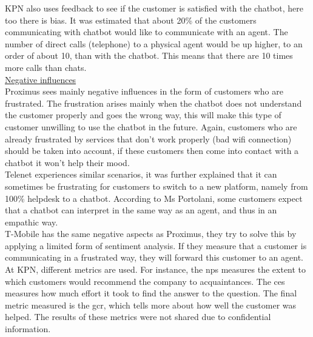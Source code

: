 \break
KPN also uses feedback to see if the customer is satisfied with the chatbot, here too there is bias. It was estimated that about 20\% of the customers communicating with chatbot would like to communicate with an agent. The number of direct calls (telephone) to a physical agent would be up higher, to an order of about 10, than with the chatbot. This means that there are 10 times more calls than chats.\\
\break
\ul{Negative influences}\\
Proximus sees mainly negative influences in the form of customers who are frustrated. The frustration arises mainly when the chatbot does not understand the customer properly and goes the wrong way, this will make this type of customer unwilling to use the chatbot in the future. Again, customers who are already frustrated by services that don't work properly (bad wifi connection) should be taken into account, if these customers then come into contact with a chatbot it won't help their mood.\\
\break
Telenet experiences similar scenarios, it was further explained that it can sometimes be frustrating for customers to switch to a new platform, namely from 100\% helpdesk to a chatbot. According to Ms Portolani, some customers expect that a chatbot can interpret in the same way as an agent, and thus in an empathic way.\\
\break
T-Mobile has the same negative aspects as Proximus, they try to solve this by applying a limited form of sentiment analysis. If they measure that a customer is communicating in a frustrated way, they will forward this customer to an agent.\\
\break
At KPN, different metrics are used. For instance, the \gls{nps} measures the extent to which customers would recommend the company to acquaintances. The \acrshort{ces} measures how much effort it took to find the answer to the question. The final metric measured is the \acrshort{gcr}, which tells more about how well the customer was helped. The results of these metrics were not shared due to confidential information.\\
\break
